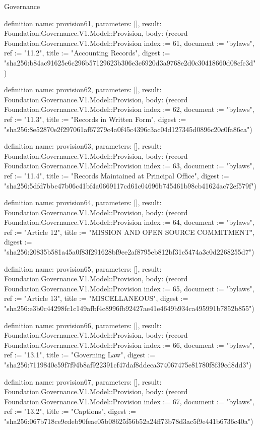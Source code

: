 \begin{lexlean}{Governance}
\begin{semanticmodule}
definition{
  name: provision61,
  parameters: [],
  result: Foundation.Governance.V1.Model::Provision,
  body: (record Foundation.Governance.V1.Model::Provision {index := 61, document := "bylaws", ref := "11.2", title := "Accounting Records", digest := "sha256:b84ac91625e6c296b57129623b306e3c6920d3a9768e2d0c30418660d08cfc3d"})
}

definition{
  name: provision62,
  parameters: [],
  result: Foundation.Governance.V1.Model::Provision,
  body: (record Foundation.Governance.V1.Model::Provision {index := 62, document := "bylaws", ref := "11.3", title := "Records in Written Form", digest := "sha256:8e52870e2f297061af67279c4a0f45c4396c3ac04d127345d0896c20c0fa86ca"})
}

definition{
  name: provision63,
  parameters: [],
  result: Foundation.Governance.V1.Model::Provision,
  body: (record Foundation.Governance.V1.Model::Provision {index := 63, document := "bylaws", ref := "11.4", title := "Records Maintained at Principal Office", digest := "sha256:5dfd7bbe47b06c41bf4a0669117cd61c04696b745461b98cb41624ac72ef579f"})
}

definition{
  name: provision64,
  parameters: [],
  result: Foundation.Governance.V1.Model::Provision,
  body: (record Foundation.Governance.V1.Model::Provision {index := 64, document := "bylaws", ref := "Article 12", title := "MISSION AND OPEN SOURCE COMMITMENT", digest := "sha256:20835b581a45a0f83f291628bf9ee2af8795eb812bf31e5474a3c0d2268255d7"})
}

definition{
  name: provision65,
  parameters: [],
  result: Foundation.Governance.V1.Model::Provision,
  body: (record Foundation.Governance.V1.Model::Provision {index := 65, document := "bylaws", ref := "Article 13", title := "MISCELLANEOUS", digest := "sha256:e3b0c44298fc1c149afbf4c8996fb92427ae41e4649b934ca495991b7852b855"})
}

definition{
  name: provision66,
  parameters: [],
  result: Foundation.Governance.V1.Model::Provision,
  body: (record Foundation.Governance.V1.Model::Provision {index := 66, document := "bylaws", ref := "13.1", title := "Governing Law", digest := "sha256:7119840c59f7f94b8af922391cf47daf8ddeca374067475e81780f8f39cd8dd3"})
}

definition{
  name: provision67,
  parameters: [],
  result: Foundation.Governance.V1.Model::Provision,
  body: (record Foundation.Governance.V1.Model::Provision {index := 67, document := "bylaws", ref := "13.2", title := "Captions", digest := "sha256:067b718ce9cdeb90feae05b08625f56b52a24ff73b78d3ac5f9e441b6736c40a"})
}


\end{semanticmodule}
\end{lexlean}
